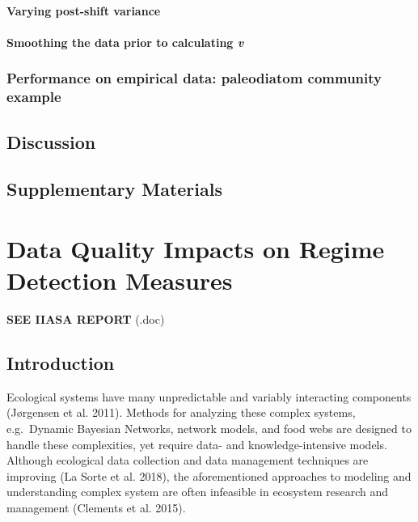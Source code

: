 \documentclass[12pt,twoside,openany]{reedthesis}
\begin{document}
\subsubsection{Varying post-shift
variance}\label{varying-post-shift-variance}

\subsubsection{\texorpdfstring{Smoothing the data prior to calculating
\emph{v}}{Smoothing the data prior to calculating v}}\label{smoothing-the-data-prior-to-calculating-v}

\subsection{Performance on empirical data: paleodiatom community
example}\label{performance-on-empirical-data-paleodiatom-community-example}

\section{Discussion}\label{discussion-2}

\section{Supplementary Materials}\label{supplementary-materials}

\chapter{Data Quality Impacts on Regime Detection
Measures}\label{resampling}

\textbf{SEE IIASA REPORT} (.doc)

\section{Introduction}\label{introduction-4}

Ecological systems have many unpredictable and variably interacting
components (Jørgensen et al. 2011). Methods for analyzing these complex
systems, e.g.~Dynamic Bayesian Networks, network models, and food webs
are designed to handle these complexities, yet require data- and
knowledge-intensive models. Although ecological data collection and data
management techniques are improving (La Sorte et al. 2018), the
aforementioned approaches to modeling and understanding complex system
are often infeasible in ecosystem research and management (Clements et
al. 2015).
\end{document}
